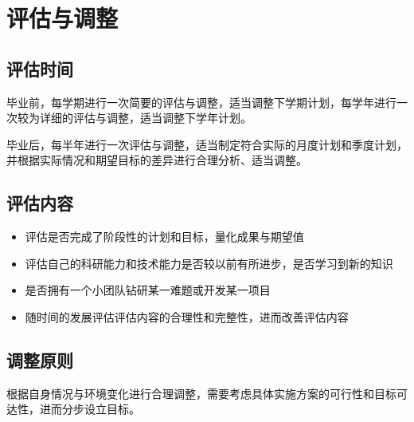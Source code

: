 \documentclass{article}
\begin{document}
\section{评估与调整}

\subsection{评估时间}

毕业前，每学期进行一次简要的评估与调整，适当调整下学期计划，每学年进行一次较为详细的评估与调整，适当调整下学年计划。

毕业后，每半年进行一次评估与调整，适当制定符合实际的月度计划和季度计划，并根据实际情况和期望目标的差异进行合理分析、适当调整。

\subsection{评估内容}

\begin{itemize}
    \item 评估是否完成了阶段性的计划和目标，量化成果与期望值
    \item 评估自己的科研能力和技术能力是否较以前有所进步，是否学习到新的知识
    \item 是否拥有一个小团队钻研某一难题或开发某一项目
    \item 随时间的发展评估评估内容的合理性和完整性，进而改善评估内容
\end{itemize}

\subsection{调整原则}

根据自身情况与环境变化进行合理调整，需要考虑具体实施方案的可行性和目标可达性，进而分步设立目标。
\end{document}
